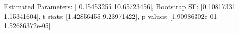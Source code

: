 Estimated Parameters: [ 0.15453255 10.65723456], Bootstrap SE: [0.10817331 1.15341604], t-stats: [1.42856455 9.23971422], p-values: [1.90986302e-01 1.52686372e-05]